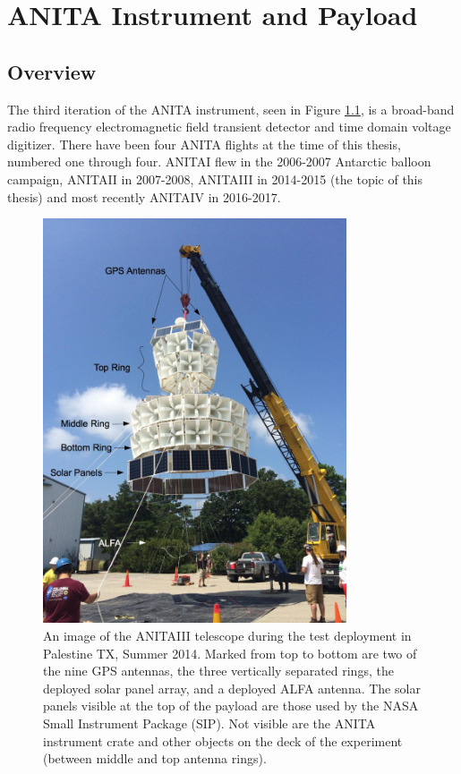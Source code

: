 
\chapter{ANITA Instrument and Payload}
\section{Overview}
	The third iteration of the ANITA instrument, seen in Figure \ref{fig:ANITA3_hangtest}, is a broad-band radio frequency electromagnetic field transient detector and time domain voltage digitizer.  There have been four ANITA flights at the time of this thesis, numbered one through four.  ANITAI flew in the 2006-2007 Antarctic balloon campaign\cite{ANITA1}, ANITAII in 2007-2008\cite{ANITA2}, ANITAIII in 2014-2015 (the topic of this thesis) and most recently ANITAIV in 2016-2017.
	
\begin{figure}
\centering
	\includegraphics[width=0.8\textwidth]{figures/ANITA3_hangtest2_annotated}
	\caption{An image of the ANITAIII telescope during the test deployment in Palestine TX, Summer 2014.  Marked from top to bottom are two of the nine GPS antennas, the three vertically separated rings, the deployed solar panel array, and a deployed ALFA antenna.  The solar panels visible at the top of the payload are those used by the NASA Small Instrument Package (SIP).  Not visible are the ANITA instrument crate and other objects on the deck of the experiment (between middle and top antenna rings).}
	\label{fig:ANITA3_hangtest}
\end{figure}	
	
